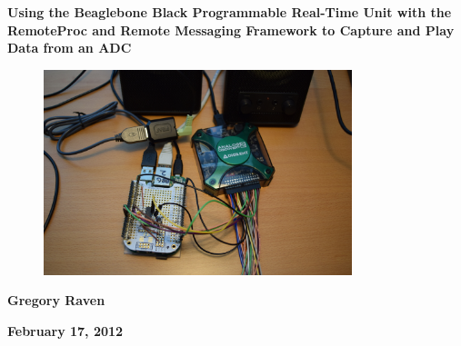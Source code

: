 {\centering\bfseries\color{black}\Huge
Using the Beaglebone Black Programmable Real-Time Unit with the RemoteProc and Remote Messaging Framework to Capture and Play Data from an ADC
\par}

\bigskip

\begin{figure}
	\centering
	\includegraphics[width=0.8\textwidth]{photos/DSC_0021}
\end{figure}

\bigskip
{\centering\bfseries\Large
Gregory Raven
\par}


\bigskip
{\centering\bfseries\LARGE
February 17, 2012
\par}
\bigskip



